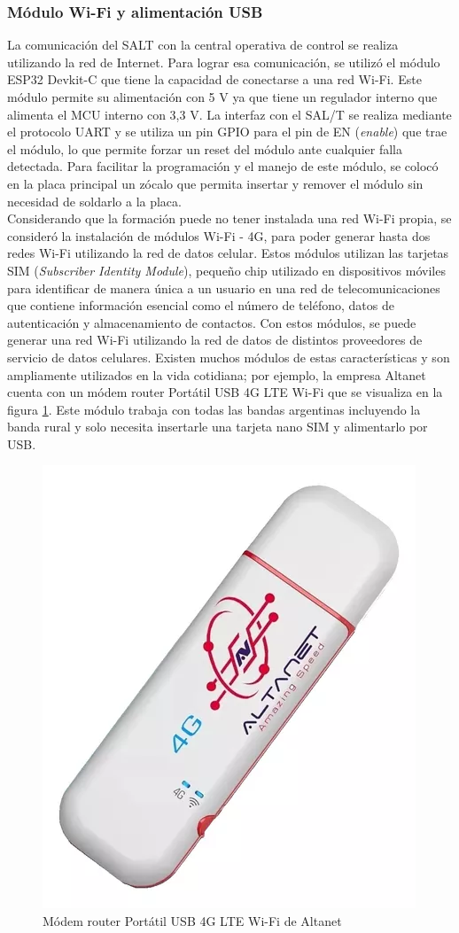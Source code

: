 \subsubsection{Módulo Wi-Fi y alimentación USB}


La comunicación del SALT con la central operativa de control se realiza utilizando la red de Internet. Para lograr esa comunicación, se utilizó el módulo ESP32 Devkit-C que tiene la capacidad de conectarse a una red Wi-Fi. Este módulo permite su alimentación con 5 V ya que tiene un regulador interno que alimenta el MCU interno con 3,3 V. La interfaz con el SAL/T se realiza mediante el protocolo UART y se utiliza un pin GPIO para el pin de EN (\textit{enable}) que trae el módulo, lo que permite forzar un reset del módulo ante cualquier falla detectada. Para facilitar la programación y el manejo de este módulo, se colocó en la placa principal un zócalo que permita insertar y remover el módulo sin necesidad de soldarlo a la placa. \\




Considerando que la formación puede no tener instalada una red Wi-Fi propia, se consideró la instalación de módulos Wi-Fi - 4G, para poder generar hasta dos redes Wi-Fi utilizando la red de datos celular. Estos módulos utilizan las tarjetas SIM (\textit{Subscriber Identity Module}), pequeño chip utilizado en dispositivos móviles para identificar de manera única a un usuario en una red de telecomunicaciones que contiene información esencial como el número de teléfono, datos de autenticación y almacenamiento de contactos. Con estos módulos, se puede generar una red Wi-Fi utilizando la red de datos de distintos proveedores de servicio de datos celulares. Existen muchos módulos de estas características y son ampliamente utilizados en la vida cotidiana; por ejemplo, la empresa Altanet cuenta con un módem router Portátil USB 4G LTE Wi-Fi \cite{altanet} que se visualiza en la figura \ref{fig:mod_4g}. Este módulo trabaja con todas las bandas argentinas incluyendo la banda rural y solo necesita insertarle una tarjeta nano SIM y alimentarlo por USB. 

\begin{figure}[H]
    \centering
    \includegraphics[width = 0.3\linewidth]{img/mod_4g.png}
    \caption{Módem router Portátil USB 4G LTE Wi-Fi de Altanet}
    \label{fig:mod_4g}
\end{figure}    


